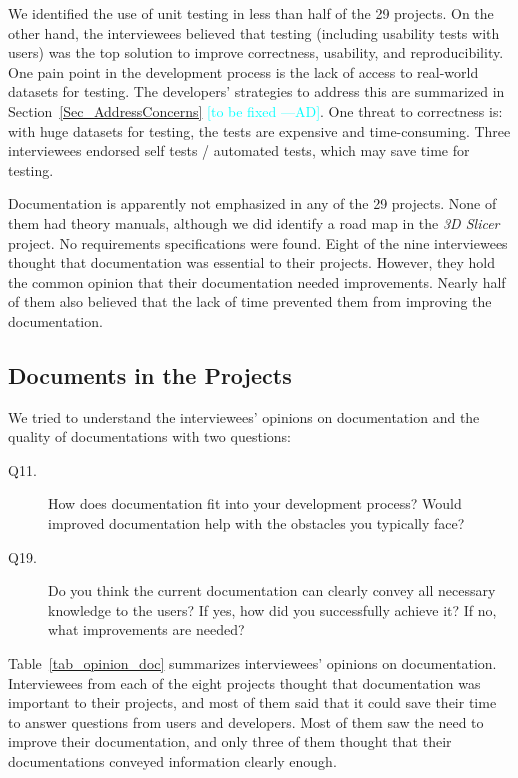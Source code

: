 \documentclass[final, 3p, times, authoryear]{elsarticle}
\newcommand{\authornote}[3]{\textcolor{#1}{[#3 ---#2]}}
\newcommand{\authornote}[3]{}
\newcommand{\ad}[1]{\authornote{cyan}{AD}{#1}} %
\begin{document}
We identified the use of unit testing in less than half of the 29 projects. On
the other hand, the interviewees believed that testing (including usability
tests with users) was the top solution to improve correctness, usability, and
reproducibility. One pain point in the development process is the lack of access
to real-world datasets for testing. The developers' strategies to address this
are summarized in Section~\ref{Sec_AddressConcerns} \ad{to be fixed}. One threat to
correctness is: with huge datasets for testing, the tests are expensive and
time-consuming. Three interviewees endorsed self tests / automated tests, which
may save time for testing.
    
Documentation is apparently not emphasized in any of the 29 projects.  None of
them had theory manuals, although we did identify a road map in the \textit{3D
Slicer} project.  No requirements specifications were found. Eight of the nine
interviewees thought that documentation was essential to their projects.
However, they hold the common opinion that their documentation needed
improvements. Nearly half of them also believed that the lack of time prevented
them from improving the documentation.

\subsection{Documents in the Projects} \label{sec_interview_documents}

We tried to understand the interviewees' opinions on documentation and the
quality of documentations with two questions:

\begin{description}
\item[Q11.] How does documentation fit into your development process? Would
improved documentation help with the obstacles you typically face?
\item[Q19.] Do you think the current documentation can clearly convey all
necessary knowledge to the users? If yes, how did you successfully achieve it?
If no, what improvements are needed?
\end{description}

Table~\ref{tab_opinion_doc} summarizes interviewees' opinions on documentation.
Interviewees from each of the eight projects thought that documentation was
important to their projects, and most of them said that it could save their time
to answer questions from users and developers. Most of them saw the need to
improve their documentation, and only three of them thought that their
documentations conveyed information clearly enough. 
\end{document}
